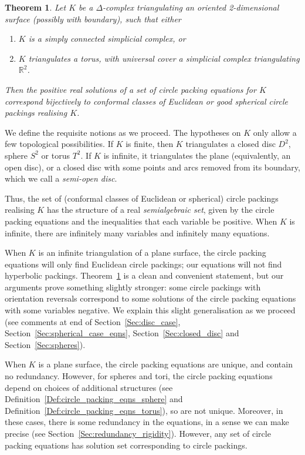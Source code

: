 \documentclass[12pt]{amsart}
\numberwithin{equation}{section}
\newtheorem{theorem}[equation]{Theorem}
\theoremstyle{named}
\newcommand{\refsec}[1]{Section~\ref{Sec:#1}}
\newcommand{\refdef}[1]{Definition~\ref{Def:#1}}
\newcommand{\refthm}[1]{Theorem~\ref{Thm:#1}}
\newcommand{\R}{\mathbb{R}}
\begin{document}
\begin{theorem}
\label{Thm:circle_packing_eqs_general}
Let $K$ be a $\Delta$-complex triangulating an oriented 2-dimensional surface (possibly with boundary), such that either
\begin{enumerate}
\item
$K$ is a simply connected simplicial complex, or
\item
$K$ triangulates a torus, with universal cover a simplicial complex triangulating $\R^2$.
\end{enumerate}
Then the positive real solutions of a set of circle packing equations for $K$ correspond bijectively to conformal classes of Euclidean or good spherical circle packings realising $K$.
\end{theorem}
We define the requisite notions
as we proceed. 
The hypotheses on $K$ only allow a few topological possibilities. If $K$ is finite, then $K$ triangulates a closed disc $D^2$, sphere $S^2$ or torus $T^2$. 
If $K$ is infinite, it triangulates the plane (equivalently, an open disc), or a closed disc with some points and arcs removed from its boundary, which we call a \emph{semi-open disc}. 


Thus, the set of (conformal classes of Euclidean or spherical) circle packings realising $K$ has the structure of a real \emph{semialgebraic set}, given by the circle packing equations and the inequalities that each variable be positive. 
When $K$ is infinite, there are infinitely many variables and infinitely many equations.


When $K$ is an infinite triangulation of a plane surface, the circle packing equations will only find Euclidean circle packings; our equations will not find hyperbolic packings. \refthm{circle_packing_eqs_general} is a clean and convenient statement, but our arguments prove something slightly stronger: some circle packings with orientation reversals correspond to some solutions of the circle packing equations with some variables negative. We explain this slight generalisation as we proceed (see comments at end of \refsec{disc_case}, \refsec{spherical_case_eqns}, \refsec{closed_disc} and \refsec{spheres}).

When $K$ is a plane surface, the circle packing equations are unique, and contain no redundancy. However, for spheres and tori, the circle packing equations depend on choices of additional structures (see \refdef{circle_packing_eqns_sphere} and \refdef{circle_packing_eqns_torus}), so are not unique. Moreover, in these cases, there is some redundancy in the equations, in a sense we can make precise (see \refsec{redundancy_rigidity}). However, any set of circle packing equations has solution set corresponding to circle packings. 
\end{document}
